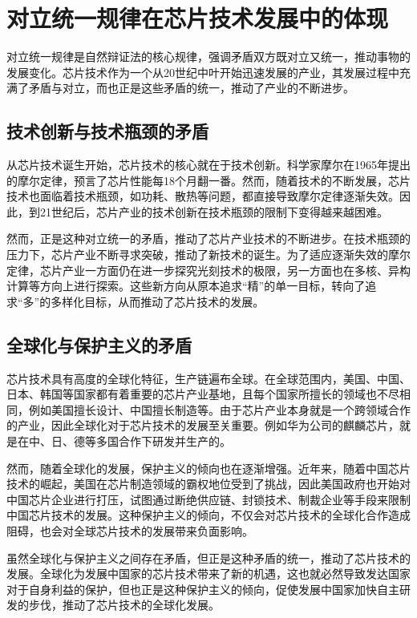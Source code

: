 \documentclass[12pt,hyperref,a4paper,UTF8]{ctexart}
\begin{document}
\section{对立统一规律在芯片技术发展中的体现}

对立统一规律是自然辩证法的核心规律，强调矛盾双方既对立又统一，推动事物的发展变化。芯片技术作为一个从20世纪中叶开始迅速发展的产业，其发展过程中充满了矛盾与对立，而也正是这些矛盾的统一，推动了产业的不断进步。

\subsection{技术创新与技术瓶颈的矛盾}

从芯片技术诞生开始，芯片技术的核心就在于技术创新。科学家摩尔在1965年提出的摩尔定律，预言了芯片性能每18个月翻一番。然而，随着技术的不断发展，芯片技术也面临着技术瓶颈，如功耗、散热等问题，都直接导致摩尔定律逐渐失效。因此，到21世纪后，芯片产业的技术创新在技术瓶颈的限制下变得越来越困难。

然而，正是这种对立统一的矛盾，推动了芯片产业技术的不断进步。在技术瓶颈的压力下，芯片产业不断寻求突破，推动了新技术的诞生。为了适应逐渐失效的摩尔定律，芯片产业一方面仍在进一步探究光刻技术的极限，另一方面也在多核、异构计算等方向上进行探索。这些新方向从原本追求“精”的单一目标，转向了追求“多”的多样化目标，从而推动了芯片技术的发展。

\subsection{全球化与保护主义的矛盾}

芯片技术具有高度的全球化特征，生产链遍布全球。在全球范围内，美国、中国、日本、韩国等国家都有着重要的芯片产业基地，且每个国家所擅长的领域也不尽相同，例如美国擅长设计、中国擅长制造等。由于芯片产业本身就是一个跨领域合作的产业，因此全球化对于芯片技术的发展至关重要。例如华为公司的麒麟芯片，就是在中、日、德等多国合作下研发并生产的。

然而，随着全球化的发展，保护主义的倾向也在逐渐增强。近年来，随着中国芯片技术的崛起，美国在芯片制造领域的霸权地位受到了挑战，因此美国政府也开始对中国芯片企业进行打压，试图通过断绝供应链、封锁技术、制裁企业等手段来限制中国芯片技术的发展。这种保护主义的倾向，不仅会对芯片技术的全球化合作造成阻碍，也会对全球芯片技术的发展带来负面影响。

虽然全球化与保护主义之间存在矛盾，但正是这种矛盾的统一，推动了芯片技术的发展。全球化为发展中国家的芯片技术带来了新的机遇，这也就必然导致发达国家对于自身利益的保护，但也正是这种保护主义的倾向，促使发展中国家加快自主研发的步伐，推动了芯片技术的全球化发展。
\end{document}
